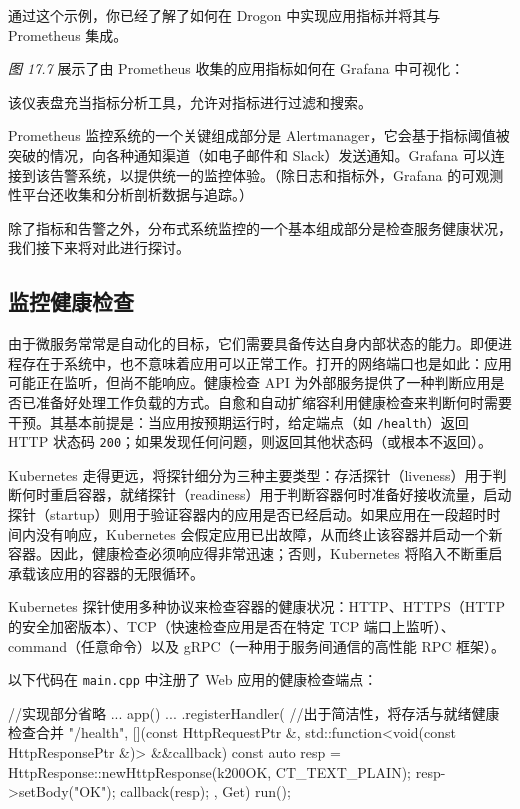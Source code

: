 通过这个示例，你已经了解了如何在 Drogon 中实现应用指标并将其与 Prometheus 集成。

\emph{图 17.7} 展示了由 Prometheus 收集的应用指标如何在 Grafana 中可视化：


\label{idx:1905}
该仪表盘充当指标分析工具，允许对指标进行过滤和搜索。

Prometheus 监控系统的一个关键组成部分是 Alertmanager，它会基于指标阈值被突破的情况，向各种通知渠道（如电子邮件和 Slack）发送通知。Grafana 可以连接到该告警系统，以提供统一的监控体验。（除日志和指标外，Grafana 的可观测性平台还收集和分析剖析数据与追踪。）

除了指标和告警之外，分布式系统监控的一个基本组成部分是检查服务健康状况，我们接下来将对此进行探讨。

\subsection{监控健康检查}

\label{idx:1906}
由于微服务常常是自动化的目标，它们需要具备传达自身内部状态的能力。即便进程存在于系统中，也不意味着应用可以正常工作。打开的网络端口也是如此：应用可能正在监听，但尚不能响应。健康检查 API 为外部服务提供了一种判断应用是否已准备好处理工作负载的方式。自愈和自动扩缩容利用健康检查来判断何时需要干预。其基本前提是：当应用按预期运行时，给定端点（如 \texttt{/health}）返回 HTTP 状态码 \texttt{200}；如果发现任何问题，则返回其他状态码（或根本不返回）。

Kubernetes 走得更远，将探针细分为三种主要类型：存活探针（liveness）用于判断何时重启容器，就绪探针（readiness）用于判断容器何时准备好接收流量，启动探针（startup）则用于验证容器内的应用是否已经启动。如果应用在一段超时时间内没有响应，Kubernetes 会假定应用已出故障，从而终止该容器并启动一个新容器。因此，健康检查必须响应得非常迅速；否则，Kubernetes 将陷入不断重启承载该应用的容器的无限循环。

Kubernetes 探针使用多种协议来检查容器的健康状况：HTTP、HTTPS（HTTP 的安全加密版本）、TCP（快速检查应用是否在特定 TCP 端口上监听）、command（任意命令）以及 gRPC（一种用于服务间通信的高性能 RPC 框架）。

以下代码在 \texttt{main.cpp} 中注册了 Web 应用的健康检查端点：

\begin{codebox}[cpp]
//实现部分省略
...
app()
    ...
    .registerHandler(
        //出于简洁性，将存活与就绪健康检查合并
        "/health",
        [](const HttpRequestPtr &,
            std::function<void(const HttpResponsePtr &)> &&callback) {
          const auto resp =
              HttpResponse::newHttpResponse(k200OK, CT_TEXT_PLAIN);
          resp->setBody("OK");
          callback(resp);
        },
        {Get})
    run();
\end{codebox}

